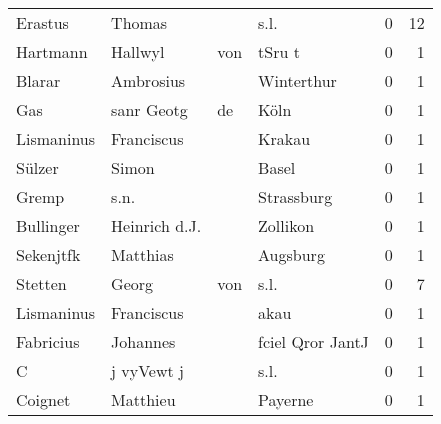 \begin{center}
\begin{tiny}
\begin{longtabu}{llllrr}
                  Erastus &                             Thomas &             &                                        s.l. &          0 &        12 \\
                 Hartmann &                            Hallwyl &         von &                                      tSru t &          0 &         1 \\
                   Blarar &                          Ambrosius &             &                                  Winterthur &          0 &         1 \\
                      Gas &                         sanr Geotg &          de &                                        Köln &          0 &         1 \\
               Lismaninus &                         Franciscus &             &                                      Krakau &          0 &         1 \\
                   Sülzer &                              Simon &             &                                       Basel &          0 &         1 \\
                    Gremp &                               s.n. &             &                                  Strassburg &          0 &         1 \\
                Bullinger &                      Heinrich d.J. &             &                                    Zollikon &          0 &         1 \\
                Sekenjtfk &                           Matthias &             &                                    Augsburg &          0 &         1 \\
                  Stetten &                              Georg &         von &                                        s.l. &          0 &         7 \\
               Lismaninus &                         Franciscus &             &                                        akau &          0 &         1 \\
                Fabricius &                           Johannes &             &                            fciel Qror JantJ &          0 &         1 \\
                        C &                         j vyVewt j &             &                                        s.l. &          0 &         1 \\
                  Coignet &                           Matthieu &             &                                     Payerne &          0 &         1 \\

\end{longtabu}
\end{tiny}
\end{center}
